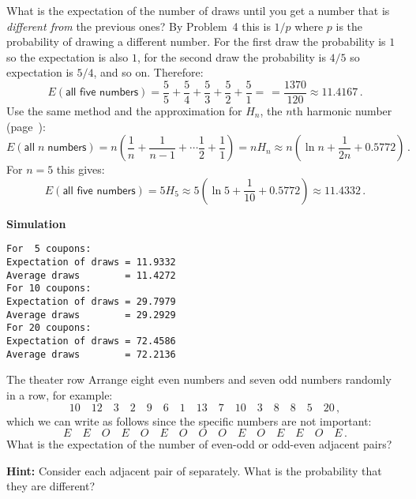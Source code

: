  What is the expectation of the number of draws until you get a  number that is \emph{different from} the previous ones? By  Problem~4 this is $1/p$ where $p$ is the probability of drawing a different number. For the first draw the probability is $1$ so the expectation is also $1$, for the second draw the probability is $4/5$ so expectation is $5/4$, and so on. Therefore:
\[
E(\textsf{all five numbers}) = \frac{5}{5}+\frac{5}{4} + \frac{5}{3} + \frac{5}{2} + \frac{5}{1} = \frac{}{} =\frac{1370}{120}\approx 11.4167\,.
\]
 Use the same method and the approximation for $H_n$, the $n$th harmonic number (page~\pageref{p.harmonic}):
\[
E(\textsf{all}\;n \;\textsf{numbers}) = n\left(\frac{1}{n}+\frac{1}{n-1} + \cdots \frac{1}{2} + \frac{1}{1}\right) =nH_n\approx n\left(\ln n + \frac{1}{2n} + 0.5772\right)\,. 
\]
For $n=5$ this gives:
\[
E(\textsf{all five numbers}) =5H_5\approx 5(\ln 5 + \frac{1}{10} + 0.5772) \approx 11.4332\,.
\]

\textbf{Simulation}
\begin{verbatim}
For  5 coupons:
Expectation of draws = 11.9332
Average draws        = 11.4272
For 10 coupons:
Expectation of draws = 29.7979
Average draws        = 29.2929
For 20 coupons:
Expectation of draws = 72.4586
Average draws        = 72.2136
\end{verbatim}


\begin{prob}{The theater row}
Arrange eight even numbers and seven odd numbers randomly in a row, for example:
\[
10\quad 12\quad 3\quad 2\quad 9\quad 6 \quad 1\quad 13\quad 7\quad 10\quad 3\quad 8\quad 8\quad 5\quad 20\,,
\]
which we can write as follows since the specific numbers are not important:
\[
E\quad E\quad O\quad E\quad O\quad E \quad O\quad O\quad O\quad E\quad O\quad E\quad E\quad O\quad E\,.
\]
What is the expectation of the number of even-odd or odd-even adjacent pairs?

\textbf{Hint:} Consider each adjacent pair of separately. What is the probability that they are different?
\end{prob}

\solution{}

